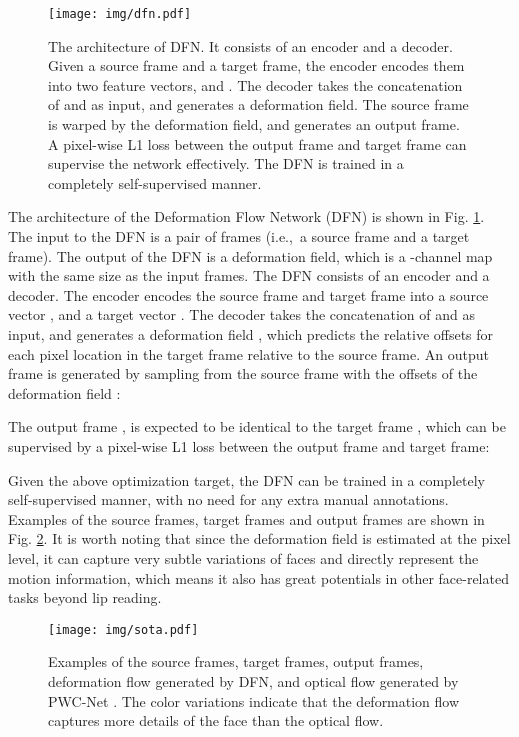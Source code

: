 \documentclass[a4paper, 10pt, conference]{ieeeconf}      \usepackage{FG2020}
\begin{document}
\begin{figure}
       \centering
       \texttt{[image: img/dfn.pdf]}
       \caption{The architecture of DFN. It consists of an encoder and a decoder. Given a source frame and a target frame, the encoder encodes them into two feature vectors,   and . The decoder takes the concatenation of  and  as input, and generates a deformation field. The source frame is warped by the deformation field, and generates an output frame. A pixel-wise L1 loss between the output frame and target frame can supervise the network effectively. The DFN is trained in a completely self-supervised manner.}
       \label{fig:dfn}
       \vspace{-0.4cm}
       \end{figure}



 The architecture of the Deformation Flow Network (DFN) is shown in Fig. \ref{fig:dfn}. The input to the DFN is a pair of frames (i.e.,\ a source frame and a target frame). The output of the DFN is a deformation field, which is a -channel map with the same size as the input frames. The DFN consists of an encoder and a decoder. The encoder encodes the source frame  and target frame  into a source vector , and a target vector  . The decoder takes the concatenation of  and  as input, and generates a deformation field , which predicts the relative offsets  for each pixel location  in the target frame relative to the source frame. An output frame  is generated by sampling from the source frame  with the offsets  of the deformation field : 
 
 
 
 The output frame , is expected to be identical to the target frame , which can be supervised by a pixel-wise L1 loss between the output frame and target frame: 
 
 
 
 Given the above optimization target, the DFN can be trained in a completely self-supervised manner, with no need for any extra manual annotations. Examples of the source frames, target frames and output frames are shown in Fig. \ref{fig:sotadf}.
It is worth noting that since the deformation field is estimated at the pixel level, it can capture very subtle variations of faces and directly represent the motion information, which means it also has great potentials in other face-related tasks beyond lip reading.
  
\begin{figure}
  \centering
   \centering
   \texttt{[image: img/sota.pdf]}
   \caption{Examples of the source frames, target frames, output frames, deformation flow generated by DFN, and optical flow generated by PWC-Net \cite{sun2018pwc}. The color variations indicate that the deformation flow captures more details of the face than the optical flow. }
   \label{fig:sotadf}
   \vspace{-0.4cm}
   \end{figure}
\end{document}
